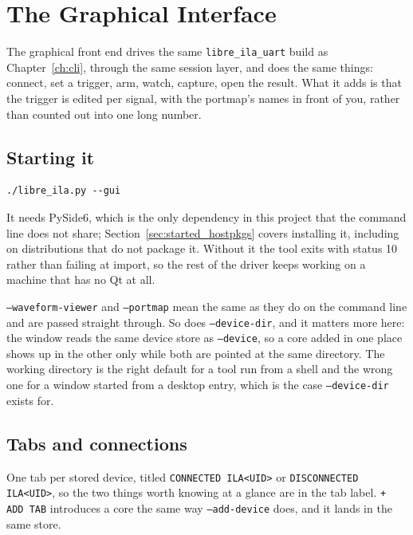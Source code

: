 \documentclass[../manual.tex]{subfiles}
\begin{document}
\chapter{The Graphical Interface}
\label{ch:gui}

The graphical front end drives the same \texttt{libre\_ila\_uart} build as Chapter~\ref{ch:cli}, through the same session layer, and does the same things: connect, set a trigger, arm, watch, capture, open the result. What it adds is that the trigger is edited per signal, with the portmap's names in front of you, rather than counted out into one long number.

\section{Starting it}
\label{sec:gui_start}

\begin{lstlisting}
./libre_ila.py --gui
\end{lstlisting}

It needs PySide6, which is the only dependency in this project that the command line does not share; Section~\ref{sec:started_hostpkgs} covers installing it, including on distributions that do not package it. Without it the tool exits with status 10 rather than failing at import, so the rest of the driver keeps working on a machine that has no Qt at all.

\texttt{--waveform-viewer} and \texttt{--portmap} mean the same as they do on the command line and are passed straight through. So does \texttt{--device-dir}, and it matters more here: the window reads the same device store as \texttt{--device}, so a core added in one place shows up in the other only while both are pointed at the same directory. The working directory is the right default for a tool run from a shell and the wrong one for a window started from a desktop entry, which is the case \texttt{--device-dir} exists for.

\section{Tabs and connections}
\label{sec:gui_tabs}

One tab per stored device, titled \texttt{CONNECTED ILA<UID>} or \texttt{DISCONNECTED ILA<UID>}, so the two things worth knowing at a glance are in the tab label. \texttt{+ ADD TAB} introduces a core the same way \texttt{--add-device} does, and it lands in the same store.
\end{document}

